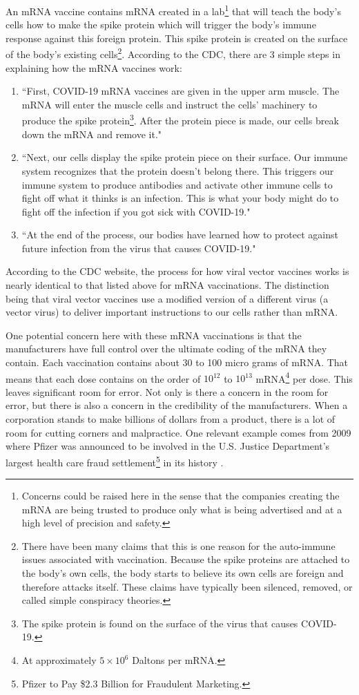 \documentclass[10pt, a4paper, twocolumn]{book}
\begin{document}
An mRNA vaccine contains mRNA created in a lab\footnote{Concerns could be raised here in the sense that the companies creating the mRNA are being trusted to produce only what is being advertised and at a high level of precision and safety.} that will teach the body's cells how to make the spike protein which will trigger the body's immune response against this foreign protein. This spike protein is created on the surface of the body's existing cells\footnote{There have been many claims that this is one reason for the auto-immune issues associated with vaccination. Because the spike proteins are attached to the body's own cells, the body starts to believe its own cells are foreign and therefore attacks itself. These claims have typically been silenced, removed, or called simple conspiracy theories.}. According to the CDC, there are 3 simple steps in explaining how the mRNA vaccines work:

\begin{enumerate}
	\item ``First, COVID-19 mRNA vaccines are given in the upper arm muscle. The mRNA will enter the muscle cells and instruct the cells’ machinery to produce the spike protein\footnote{The spike protein is found on the surface of the virus that causes COVID-19.}. After the protein piece is made, our cells break down the mRNA and remove it."
	\item ``Next, our cells display the spike protein piece on their surface. Our immune system recognizes that the protein doesn’t belong there. This triggers our immune system to produce antibodies and activate other immune cells to fight off what it thinks is an infection. This is what your body might do to fight off the infection if you got sick with COVID-19."
	\item ``At the end of the process, our bodies have learned how to protect against future infection from the virus that causes COVID-19."
\end{enumerate}

According to the CDC website, the process for how viral vector vaccines works is nearly identical to that listed above for mRNA vaccinations. The distinction being that viral vector vaccines use a modified version of a different virus (a vector virus) to deliver important instructions to our cells rather than mRNA.

One potential concern here with these mRNA vaccinations is that the manufacturers have full control over the ultimate coding of the mRNA they contain. Each vaccination contains about 30 to 100 micro grams of mRNA. That means that each dose contains on the order of $10^{12}$ to $10^{13}$ mRNA\footnote{At approximately $5 \times 10^6$ Daltons per mRNA.} per dose. This leaves significant room for error. Not only is there a concern in the room for error, but there is also a concern in the credibility of the manufacturers. When a corporation stands to make billions of dollars from a product, there is a lot of room for cutting corners and malpractice. One relevant example comes from 2009 where Pfizer was announced to be involved in the U.S. Justice Department's largest health care fraud settlement\footnote{Pfizer to Pay \$2.3 Billion for Fraudulent Marketing.} in its history \citep{PfizerFraudulentMarketing}. 
\end{document}
